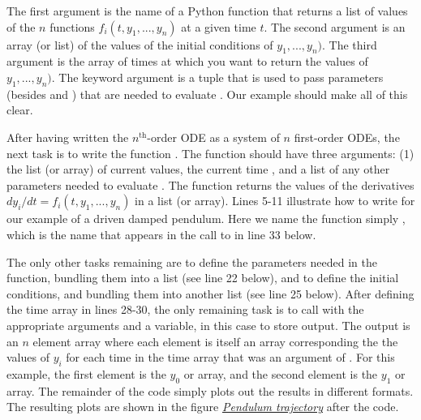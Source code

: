 \documentclass[letterpaper,10pt,english]{sphinxmanual}
\begin{document}
The first argument  is the name of a Python function that returns a list of values of the \(n\) functions \(f_i(t, y_1, ..., y_n)\) at a given time \(t\).  The second argument  is an array (or list) of the values of the initial conditions of \(y_1, ..., y_n)\).  The third argument is the array of times at which you want  to return the values of \(y_1, ..., y_n)\).  The keyword argument  is a tuple that is used to pass parameters (besides  and ) that are needed to evaluate .  Our example should make all of this clear.

After having written the \(n^\mathrm{th}\)-order ODE as a system of \(n\) first-order ODEs, the next task is to write the function .  The function  should have three arguments: (1) the list (or array) of current  values, the current time , and a list of any other parameters  needed to evaluate .  The function  returns the values of the derivatives \(dy_i/dt = f_i(t, y_1, ..., y_n)\) in a list (or array).  Lines 5-11 illustrate how to write  for our example of a driven damped pendulum.  Here we name the function simply , which is the name that appears in the call to  in line 33 below.

The only other tasks remaining are to define the parameters needed in the function, bundling them into a list (see line 22 below),  and to define the initial conditions, and bundling them into another list (see line 25 below).  After defining the time array in lines 28-30, the only remaining task is to call  with the appropriate arguments and a variable,  in this case to store output.  The output  is an \(n\) element array where each element is itself an array corresponding the the values of \(y_i\) for each time in the time  array that was an argument of .  For this example, the first element  is the \(y_0\) or  array, and the second element  is the \(y_1\) or  array.  The remainder of the code simply plots out the results in different formats.  The resulting plots are shown in the figure {\hyperref[chap9/chap9_scipy:fig-odepend]{\emph{Pendulum trajectory}}} after the code.
\end{document}
